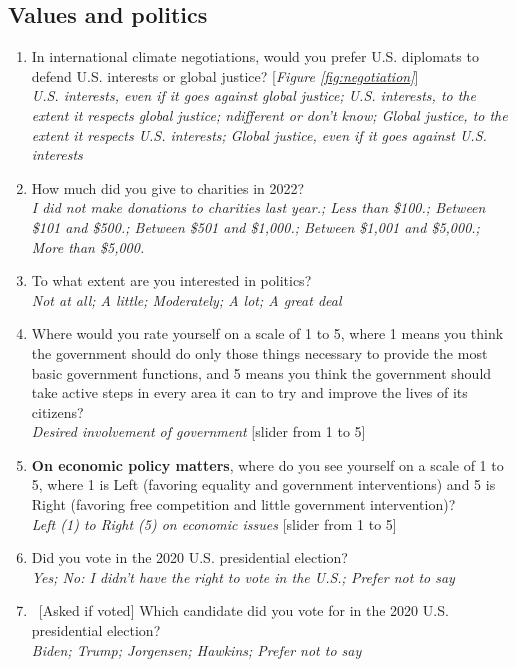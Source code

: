 \subsection*{Values and politics}
\begin{enumerate}[resume] \item \label{q:negotiation} In international climate negotiations, would you prefer U.S. diplomats to defend U.S. interests or global justice? [\textit{Figure \ref{fig:negotiation}}]
\\ \textit{U.S. interests, even if it goes against global justice; U.S. interests, to the extent it respects global justice; ndifferent or don't know; Global justice, to the extent it respects U.S. interests; Global justice, even if it goes against U.S. interests}
\item How much did you give to charities in 2022?
\\ \textit{I did not make donations to charities last year.; Less than \$100.; Between \$101 and \$500.; Between \$501 and \$1,000.; Between \$1,001 and \$5,000.; More than \$5,000.}
\item To what extent are you interested in politics?
\\ \textit{Not at all; A little; Moderately; A lot; A great deal}
\item Where would you rate yourself on a scale of 1 to 5, where 1 means you think the government should do only those things necessary to provide the most basic government functions, and 5 means you think the government should take active steps in every area it can to try and improve the lives of its citizens?
\\ \textit{Desired involvement of government} [slider from 1 to 5]
\item \textbf{On economic policy matters}, where do you see yourself on a scale of 1 to 5, where 1 is Left (favoring equality and government interventions) and 5 is Right (favoring free competition and little government intervention)?
\\ \textit{Left (1) to Right (5) on economic issues} [slider from 1 to 5]
\item Did you vote in the 2020 U.S. presidential election? \label{item:election}
\\ \textit{Yes; No: I didn't have the right to vote in the U.S.; Prefer not to say}
\item ~[Asked if voted] Which candidate did you vote for in the 2020 U.S. presidential election?
\\ \textit{Biden; Trump; Jorgensen; Hawkins; Prefer not to say}

\end{enumerate}
